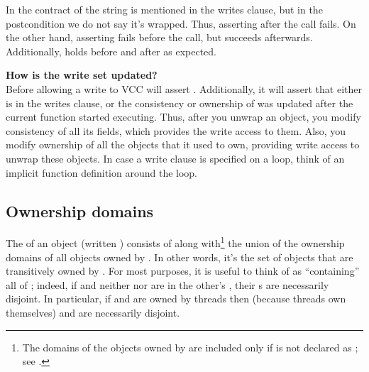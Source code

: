 
\noindent
In the contract of  the string  is mentioned
in the writes clause, but in the postcondition we do not say it's wrapped.
Thus, asserting  after the call fails.
On the other hand, asserting  fails before the call,
but succeeds afterwards.
Additionally,  holds before and after as expected.

\begin{note}
\textbf{How is the write set updated?} \\
Before allowing a write to  VCC will assert .
Additionally, it will assert that either  is in the writes
clause, or the consistency or ownership of  was updated after the current
function started executing.
Thus, after you unwrap an object, you modify consistency of all its fields,
which provides the write access to them.
Also, you modify ownership of all the objects that it used to own, providing
write access to unwrap these objects.
In case a write clause is specified on a loop, think of an implicit function
definition around the loop.
\end{note}

%
%
%

\subsection{Ownership domains}

The  of an object  (written
) consists of  along with\footnote{ The domains
  of the objects owned by  are included only if  is not
  declared as ; see .} the
union of the ownership domains of all objects owned by .  In
other words, it's the set of objects that are transitively owned by
. For most purposes, it is useful to think of  as
``containing'' all of ; indeed, if  and
neither  nor  are in the other's \vcc{\domain}, their
\vcc{\domain}s are necessarily disjoint. In particular, if 
and  are owned by threads then (because threads own
themselves)  and  are necessarily disjoint.

